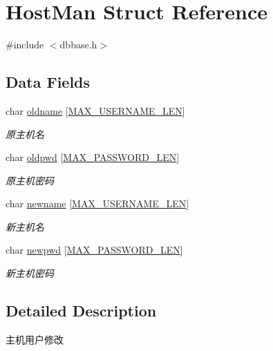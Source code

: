 \hypertarget{structHostMan}{\section{Host\-Man Struct Reference}
\label{structHostMan}
}


{\ttfamily \#include $<$dbbase.\-h$>$}

\subsection*{Data Fields}
\begin{DoxyCompactItemize}
\item 
char \hyperlink{structHostMan_a1441529ae42ac0b02704431e41f5b5c3}{oldname} \mbox{[}\hyperlink{dbbase_8h_a6c4647395896246d6710ba980c31666c}{M\-A\-X\-\_\-\-U\-S\-E\-R\-N\-A\-M\-E\-\_\-\-L\-E\-N}\mbox{]}
\begin{DoxyCompactList}\small\item\em 原主机名 \end{DoxyCompactList}\item 
char \hyperlink{structHostMan_a94f32dd3715b3069fa469ca3ea5ea1e7}{oldpwd} \mbox{[}\hyperlink{dbbase_8h_ae9169c3fda2dfecbb7a13e394a69e5be}{M\-A\-X\-\_\-\-P\-A\-S\-S\-W\-O\-R\-D\-\_\-\-L\-E\-N}\mbox{]}
\begin{DoxyCompactList}\small\item\em 原主机密码 \end{DoxyCompactList}\item 
char \hyperlink{structHostMan_a51767ec848f109bccbddb87550ff88d9}{newname} \mbox{[}\hyperlink{dbbase_8h_a6c4647395896246d6710ba980c31666c}{M\-A\-X\-\_\-\-U\-S\-E\-R\-N\-A\-M\-E\-\_\-\-L\-E\-N}\mbox{]}
\begin{DoxyCompactList}\small\item\em 新主机名 \end{DoxyCompactList}\item 
char \hyperlink{structHostMan_a6f5cb28d8740dae24ee076d6cd2fb63e}{newpwd} \mbox{[}\hyperlink{dbbase_8h_ae9169c3fda2dfecbb7a13e394a69e5be}{M\-A\-X\-\_\-\-P\-A\-S\-S\-W\-O\-R\-D\-\_\-\-L\-E\-N}\mbox{]}
\begin{DoxyCompactList}\small\item\em 新主机密码 \end{DoxyCompactList}\end{DoxyCompactItemize}


\subsection{Detailed Description}
主机用户修改 

